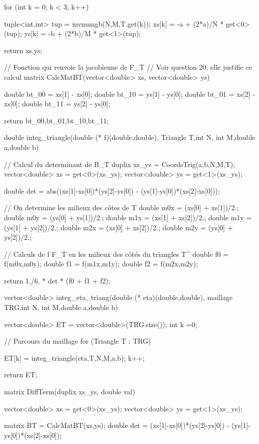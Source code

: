 \begin{codeblock}
{{    for (int k = 0; k < 3; k++){
        tuple<int,int> tup = invnumgb(N,M,T.get(k));
        xs[k] = -a + (2*a)/N * get<0>(tup);
        ys[k] = -b + (2*b)/M * get<1>(tup);

    }

    return {xs,ys};
}


// Fonction qui renvoie la jacobienne de F_T
// Voir question 20, elle justifie ce calcul
matrix CalcMatBT(vector<double> xs, vector<double> ys){
    double bt_00 = xs[1] - xs[0];
    double bt_10 = ys[1] - ys[0];
    double bt_01 = xs[2] - xs[0];
    double bt_11 = ys[2] - ys[0];

    return {{bt_00,bt_01},{bt_10,bt_11}};
}




double integ_triangle(double (* f)(double,double), Triangle T,int N, int M,double a,double b){

    // Calcul du determinant de B_T
    duplix xs_ys = CoordsTrig(a,b,N,M,T);
    vector<double> xs = get<0>(xs_ys);
    vector<double> ys = get<1>(xs_ys);

    double det = abs((xs[1]-xs[0])*(ys[2]-ys[0]) - (ys[1]-ys[0])*(xs[2]-xs[0]));

    // On determine les milieux des côtes de T
    double m0x = (xs[0] + xs[1])/2.;
    double m0y = (ys[0] + ys[1])/2.;
    double m1x = (xs[1] + xs[2])/2.;
    double m1y = (ys[1] + ys[2])/2.;
    double m2x = (xs[0] + xs[2])/2.;
    double m2y = (ys[0] + ys[2])/2.;

    // Calculs de f \circ F_T en les milieux des côtés du triangles T^
    double f0 = f(m0x,m0y);
    double f1 = f(m1x,m1y);
    double f2 = f(m2x,m2y);

    return 1./6. * det * (f0 + f1 + f2);
}


vector<double> integ_eta_triang(double (* eta)(double,double),
    maillage TRG,int N, int M,double a,double b){

    vector<double> ET = vector<double>(TRG.size());
    int k =0;

    // Parcours du maillage
    for (Triangle T : TRG){


        ET[k] = integ_triangle(eta,T,N,M,a,b);
        k++;
    }

    return ET;
}


matrix DiffTerm(duplix xs_ys, double val){
    vector<double> xs = get<0>(xs_ys);
    vector<double> ys = get<1>(xs_ys);

    matrix BT = CalcMatBT(xs,ys);
    double det = (xs[1]-xs[0])*(ys[2]-ys[0]) - (ys[1]-ys[0])*(xs[2]-xs[0]);

}}
\end{codeblock}
